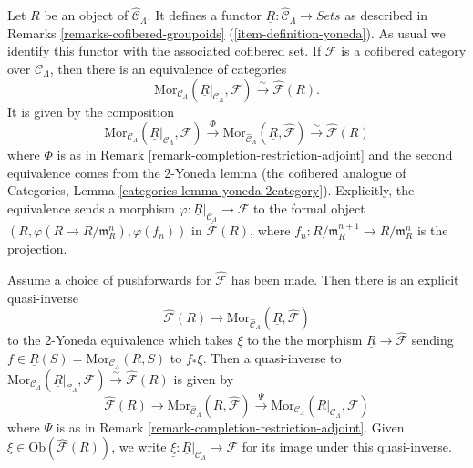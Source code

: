 \begin{remark}
\label{remark-formal-objects-yoneda}
Let $R$ be an object of $\widehat{\mathcal{C}}_\Lambda$.  It defines a functor 
$\underline{R}: \widehat{\mathcal{C}}_\Lambda \to \textit{Sets}$ 
as described in
Remarks \ref{remarks-cofibered-groupoids} (\ref{item-definition-yoneda}).
As usual we identify this functor with the 
associated cofibered set.  If $\mathcal{F}$ is a cofibered category over 
$\mathcal{C}_\Lambda$, then there is an equivalence of categories
\[
\text{Mor}_{\mathcal{C}_\Lambda}(\underline{R}|_{\mathcal{C}_\Lambda}, 
\mathcal{F}) 
\xrightarrow{\sim} 
\widehat{\mathcal{F}}(R).
\]
It is given by the composition
\[
\text{Mor}_{\mathcal{C}_\Lambda}(\underline{R}|_{\mathcal{C}_\Lambda}, 
\mathcal{F}) 
\xrightarrow{\Phi} 
\text{Mor}_{\widehat{\mathcal{C}}_\Lambda}(\underline{R}, 
\widehat{\mathcal{F}}) 
\xrightarrow{\sim}
\widehat{\mathcal{F}}(R)
\]
where $\Phi$ is as in Remark \ref{remark-completion-restriction-adjoint} and 
the second equivalence comes from the 2-Yoneda lemma (the cofibered analogue of 
Categories, Lemma \ref{categories-lemma-yoneda-2category}).
Explicitly, the equivalence sends a 
morphism $\varphi: \underline{R}|_{\mathcal{C}_\Lambda} \to \mathcal 
F$ to the formal object $(R, \varphi(R \to R/\mathfrak{m}_R^n), 
\varphi(f_n))$ in $\widehat{\mathcal{F}}(R)$, where $f_{n}: 
R/\mathfrak{m}_R^{n+1} \to R/\mathfrak{m}_{R}^{n}$ is the projection.  

\medskip \noindent
Assume a choice of pushforwards for $\widehat{\mathcal{F}}$ has been made.  Then 
there is an explicit quasi-inverse
\[ \widehat{\mathcal{F}}(R) \to \text{Mor}_{\widehat{\mathcal 
C}_\Lambda}(\underline{R}, \widehat{\mathcal{F}}) \]
to the 2-Yoneda equivalence which takes $\xi$ to the the morphism 
$\underline{R} \to \widehat{\mathcal{F}}$ sending $f \in 
\underline{R}(S) = \text{Mor}_{\mathcal{C}_\Lambda}(R,S)$ to $f_* \xi$.  Then 
a quasi-inverse to $\text{Mor}_{\mathcal 
C_\Lambda}(\underline{R}|_{\mathcal{C}_\Lambda}, \mathcal{F}) 
\xrightarrow{\sim} 
\widehat{\mathcal{F}}(R)$ is given by
\[
\widehat{\mathcal{F}}(R) 
\to 
\text{Mor}_{\widehat{\mathcal{C}}_\Lambda}(\underline{R}, 
\widehat{\mathcal{F}})
\xrightarrow{\Psi}
\text{Mor}_{\mathcal{C}_\Lambda}(\underline{R}|_{\mathcal{C}_\Lambda}, 
\mathcal{F})
\]
where $\Psi$ is as in Remark \ref{remark-completion-restriction-adjoint}.  
Given $\xi \in \text{Ob}(\widehat{\mathcal{F}}(R))$, we write $\underline{\xi}: 
\underline{R}|_{\mathcal{C}_\Lambda} \to \mathcal{F}$ for its image 
under this quasi-inverse.
\end{remark}

